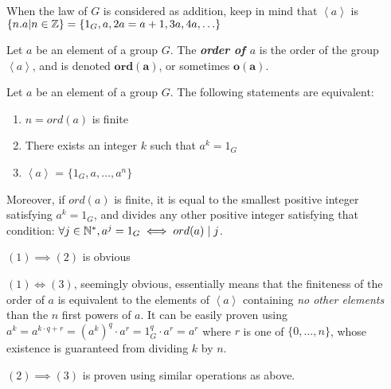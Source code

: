 \begin{remark}
         When the law of $G$ is considered as addition, keep in mind that $\left\langle a \right\rangle$ is $\{n.a | n \in \mathbb{Z}\} = \{1_G, a, 2a = a+1, 3a, 4a, \hdots \}$
\end{remark}

\begin{boxedDefinition}
    Let $a$ be an element of a group $G$.
    The \textbf{\textit{order of $a$}} is the order of the group $\left\langle a \right\rangle$, and is denoted $\bm{ord(a)}$, or sometimes $\bm{o(a)}$.
\end{boxedDefinition}

\begin{boxedProposition} \label{prop:cyclic-order-finiteness}
    Let $a$ be an element of a group $G$. The following statements are equivalent:
    \begin{enumerate} 
        
        \item $n=ord(a)$ is finite
        \item There exists an integer $k$ such that $a^k = 1_G$
        \item $\left\langle a \right\rangle$ = $\{1_G, a, \hdots, a^n\}$
    \end{enumerate}
    Moreover, if $ord(a)$ is finite, it is equal to the smallest positive integer satisfying $a^k = 1_G$, and divides any other positive integer satisfying that condition: $\forall j \in \mathbb{N}^*, a^j = 1_G \iff ord(a) \mid j$.
\end{boxedProposition}
    $(1) \implies (2)$ is obvious

    $(1) \iff (3)$, seemingly obvious, essentially means that the finiteness of the order of $a$ is equivalent to the elements of $\left\langle a \right\rangle$ containing \textit{no other elements} than the $n$ first powers of $a$. It can be easily proven using $a^k = a^{k\cdot q + r} = (a^k)^q\cdot a^r = 1_G^q\cdot a^r = a^r$ where $r$ is one of $\{0, \hdots, n\}$, whose existence is guaranteed from dividing $k$ by $n$.

    $(2) \implies (3)$ is proven using similar operations as above.

